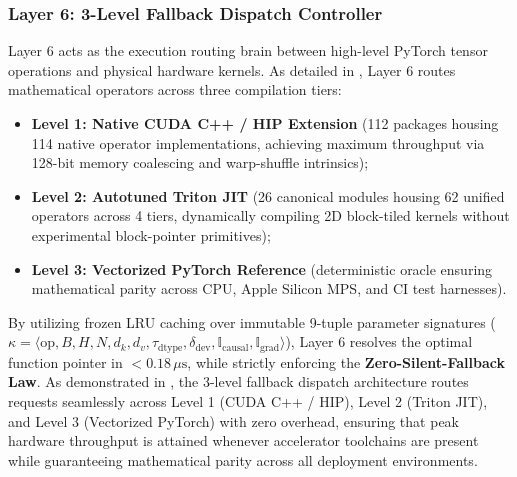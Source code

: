 \subsubsection{Layer 6: 3-Level Fallback Dispatch Controller}
Layer 6 acts as the execution routing brain between high-level PyTorch tensor operations and physical hardware kernels. As detailed in , Layer 6 routes mathematical operators across three compilation tiers:
\begin{itemize}
    \item \textbf{Level 1: Native CUDA C++ / HIP Extension} (112 packages housing 114 native operator implementations, achieving maximum throughput via 128-bit memory coalescing and warp-shuffle intrinsics);
    \item \textbf{Level 2: Autotuned Triton JIT} (26 canonical modules housing 62 unified operators across 4 tiers, dynamically compiling 2D block-tiled kernels without experimental block-pointer primitives);
    \item \textbf{Level 3: Vectorized PyTorch Reference} (deterministic oracle ensuring mathematical parity across CPU, Apple Silicon MPS, and CI test harnesses).
\end{itemize}
By utilizing frozen LRU caching over immutable 9-tuple parameter signatures ($\kappa = \langle \text{op}, B, H, N, d_k, d_v, \tau_{\text{dtype}}, \delta_{\text{dev}}, \mathbb{I}_{\text{causal}}, \mathbb{I}_{\text{grad}} \rangle$), Layer 6 resolves the optimal function pointer in $<0.18\,\mu\text{s}$, while strictly enforcing the \textbf{Zero-Silent-Fallback Law}. As demonstrated in , the 3-level fallback dispatch architecture routes requests seamlessly across Level 1 (CUDA C++ / HIP), Level 2 (Triton JIT), and Level 3 (Vectorized PyTorch) with zero overhead, ensuring that peak hardware throughput is attained whenever accelerator toolchains are present while guaranteeing mathematical parity across all deployment environments.

